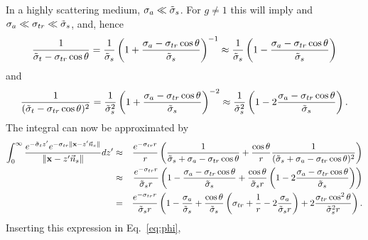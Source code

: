 \documentclass[10pt,a4paper]{article}
\begin{document}
In a highly scattering medium, $\sigma_a \ll \tilde{\sigma}_s$. For $g \ne 1$ this will imply and $\sigma_a \ll \sigma_{tr} \ll \tilde{\sigma}_s$, and, hence
\begin{equation*}
    \frac{1}{\tilde{\sigma}_t - \sigma_{tr} \cos \theta} =
    \frac{1}{\tilde{\sigma}_s} \left(1 +
    \frac{\sigma_a - \sigma_{tr} \cos \theta}{\tilde{\sigma}_s}  \right)^{-1} \approx
    \frac{1}{\tilde{\sigma}_s}  \left(1 -
    \frac{\sigma_a - \sigma_{tr} \cos \theta}{\tilde{\sigma}_s}  \right)
\end{equation*}
and
\begin{equation*}
    \frac{1}{(\tilde{\sigma}_t - \sigma_{tr} \cos \theta)^2} =
    \frac{1}{\tilde{\sigma}_s^2} \left(1 + \frac{\sigma_a - \sigma_{tr} \cos \theta}{\tilde{\sigma}_s}  \right)^{-2} \approx
    \frac{1}{\tilde{\sigma}_s^2}  \left(1 - 2 \frac{\sigma_a - \sigma_{tr} \cos \theta}{\tilde{\sigma}_s}  \right).
\end{equation*}
The integral can now be approximated by
\begin{eqnarray*}
     \int_0^\infty  \frac{e^{-\tilde{\sigma}_t z'} e^{-\sigma_{tr}\|\mathbf{x}
    - z' \vec{n}_s\| }}{\|\mathbf{x} - z' \vec{n}_s\|} dz' & \approx &
   \frac{e^{-\sigma_{tr} r}}{r} \left( \frac{1}{\tilde{\sigma}_s + \sigma_a - \sigma_{tr}
    \cos \theta } + \frac{\cos \theta}{r} \frac{1}{(\tilde{\sigma}_s + \sigma_a - \sigma_{tr} \cos \theta)^2}
    \right) \\
    &\approx & \frac{e^{-\sigma_{tr} r}}{\tilde{\sigma}_s r} \left(1 -
    \frac{\sigma_a - \sigma_{tr} \cos \theta}{\tilde{\sigma}_s}      +  \frac{\cos \theta}{\tilde{\sigma}_s r} \left(1 - 2 \frac{\sigma_a - \sigma_{tr} \cos \theta}{\tilde{\sigma}_s}  \right)
    \right) \\
    &=&\frac{e^{-\sigma_{tr} r}}{\tilde{\sigma}_s r} \left(1 -
    \frac{\sigma_a}{\tilde{\sigma}_s} + \frac{\cos \theta}{\tilde{\sigma}_s} \left(
    \sigma_{tr} + \frac{1}{r} - 2 \frac{\sigma_a}{\tilde{\sigma}_s r} \right) + 2
    \frac{\sigma_{tr} \cos^2\theta}{\tilde{\sigma}_s^2 r} \right).
\end{eqnarray*}
Inserting this expression in Eq.~\ref{eq:phi},
\end{document}

